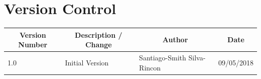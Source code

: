 \documentclass[a4paper,12pt]{book}
\makeatletter
\def\cleardoublepage{\clearpage\if@twoside \ifodd\c@page\else%
  \hbox{}%
  \thispagestyle{empty}%
  \newpage%
  \if@twocolumn\hbox{}\newpage\fi\fi\fi}
\theoremstyle{break}
\makeatother
\begin{document}

\frontmatter

\chapter*{Version Control}
\begin{table}[!h]
\centering
\label{my-label}
\begin{tabular}{|l|l|l|l|}
\hline
\multicolumn{1}{|c|}{\textbf{Version Number}} & \multicolumn{1}{c|}{\textbf{Description / Change}} & \multicolumn{1}{c|}{\textbf{Author}} & \multicolumn{1}{c|}{\textbf{Date}} \\ \hline
1.0                                           & Initial Version                                    & Santiago-Smith Silva-Rincon          & 09/05/2018                         \\ \hline
\end{tabular}
\end{table}

\clearpage
\tableofcontents

\clearpage

\clearpage


\mainmatter
\pagestyle{fancy}

\cleardoublepage



% 
% 
% 
% 
% 
% 
% 

\clearpage

\end{document}
